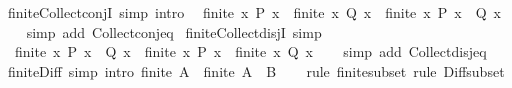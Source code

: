 \begin{isabellebody}
\endisatagproof
{\isafoldproof}%
%
\isadelimproof
\isanewline
%
\endisadelimproof
\isanewline
{}\isamarkupfalse%
\ finite{\isacharunderscore}{\kern0pt}Collect{\isacharunderscore}{\kern0pt}conjI\ {\isacharbrackleft}{\kern0pt}simp{\isacharcomma}{\kern0pt}\ intro{\isacharbrackright}{\kern0pt}{\isacharcolon}{\kern0pt}\isanewline
\ \ {\isachardoublequoteopen}finite\ {\isacharbraceleft}{\kern0pt}x{\isachardot}{\kern0pt}\ P\ x{\isacharbraceright}{\kern0pt}\ {\isasymor}\ finite\ {\isacharbraceleft}{\kern0pt}x{\isachardot}{\kern0pt}\ Q\ x{\isacharbraceright}{\kern0pt}\ {\isasymLongrightarrow}\ finite\ {\isacharbraceleft}{\kern0pt}x{\isachardot}{\kern0pt}\ P\ x\ {\isasymand}\ Q\ x{\isacharbraceright}{\kern0pt}{\isachardoublequoteclose}\isanewline
%
\isadelimproof
\ \ %
\endisadelimproof
%
\isatagproof
{}\isamarkupfalse%
\ {\isacharparenleft}{\kern0pt}simp\ add{\isacharcolon}{\kern0pt}\ Collect{\isacharunderscore}{\kern0pt}conj{\isacharunderscore}{\kern0pt}eq{\isacharparenright}{\kern0pt}%
\endisatagproof
{\isafoldproof}%
%
\isadelimproof
\isanewline
%
\endisadelimproof
\isanewline
{}\isamarkupfalse%
\ finite{\isacharunderscore}{\kern0pt}Collect{\isacharunderscore}{\kern0pt}disjI\ {\isacharbrackleft}{\kern0pt}simp{\isacharbrackright}{\kern0pt}{\isacharcolon}{\kern0pt}\isanewline
\ \ {\isachardoublequoteopen}finite\ {\isacharbraceleft}{\kern0pt}x{\isachardot}{\kern0pt}\ P\ x\ {\isasymor}\ Q\ x{\isacharbraceright}{\kern0pt}\ {\isasymlongleftrightarrow}\ finite\ {\isacharbraceleft}{\kern0pt}x{\isachardot}{\kern0pt}\ P\ x{\isacharbraceright}{\kern0pt}\ {\isasymand}\ finite\ {\isacharbraceleft}{\kern0pt}x{\isachardot}{\kern0pt}\ Q\ x{\isacharbraceright}{\kern0pt}{\isachardoublequoteclose}\isanewline
%
\isadelimproof
\ \ %
\endisadelimproof
%
\isatagproof
{}\isamarkupfalse%
\ {\isacharparenleft}{\kern0pt}simp\ add{\isacharcolon}{\kern0pt}\ Collect{\isacharunderscore}{\kern0pt}disj{\isacharunderscore}{\kern0pt}eq{\isacharparenright}{\kern0pt}%
\endisatagproof
{\isafoldproof}%
%
\isadelimproof
\isanewline
%
\endisadelimproof
\isanewline
{}\isamarkupfalse%
\ finite{\isacharunderscore}{\kern0pt}Diff\ {\isacharbrackleft}{\kern0pt}simp{\isacharcomma}{\kern0pt}\ intro{\isacharbrackright}{\kern0pt}{\isacharcolon}{\kern0pt}\ {\isachardoublequoteopen}finite\ A\ {\isasymLongrightarrow}\ finite\ {\isacharparenleft}{\kern0pt}A\ {\isacharminus}{\kern0pt}\ B{\isacharparenright}{\kern0pt}{\isachardoublequoteclose}\isanewline
%
\isadelimproof
\ \ %
\endisadelimproof
%
\isatagproof
{}\isamarkupfalse%
\ {\isacharparenleft}{\kern0pt}rule\ finite{\isacharunderscore}{\kern0pt}subset{\isacharcomma}{\kern0pt}\ rule\ Diff{\isacharunderscore}{\kern0pt}subset{\isacharparenright}{\kern0pt}%

\end{isabellebody}
